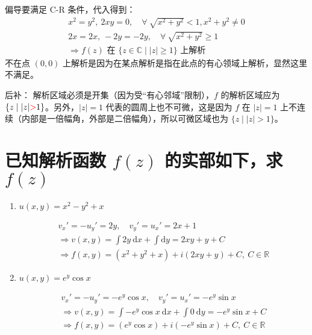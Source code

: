 \documentclass[UTF8]{report}
\def\R{\mathbb{R}}
\def\C{\mathbb{C}}
\theoremstyle{MyLineTheoremStyle} %
\theoremstyle{MyBlockTheoremStyle} %
\theoremstyle{MySubsubsectionStyle} %
\begin{document}
\begin{enumerate}
偏导要满足 C-R 条件，代入得到：
\begin{gather*}
x^2 = y^2,\  2xy = 0, \quad \forall\  \sqrt{x^2+y^2} < 1, x^2 + y^2 \ne 0  \\
2x = 2x,\ -2y = -2y, \quad \forall\ \sqrt{x^2+y^2} \geqslant 1 \\ 
\Longrightarrow \text{$f(z)$ 在 $\{ z\in \C \mid |z| \geqslant 1 \}$ 上解析}
\end{gather*}
不在点 $(0,0)$ 上解析是因为在某点解析是指在此点的有心领域上解析，显然这里不满足。

{\par\color{gray}\small
后补：{\color{red} 解析区域必须是开集}（因为受“有心邻域”限制），$f$ 的解析区域应为 $\{ z\mid | z | {\color{red} >} 1 \}$。另外，$| z | = 1$ 代表的圆周上也不可微，这是因为 $f$ 在 $| z | =1$ 上不连续（内部是一倍幅角，外部是二倍幅角），所以可微区域也为 $\{z \mid | z | >1\}$。
\par}


\end{enumerate}


\section{已知解析函数 $f(z)$ 的实部如下，求 $f(z)$}
\begin{enumerate}
\item $u(x,y) = x^2-y^2 + x$

\begin{gather*}
v_x' = -u_y' = 2y,\quad v_y' = u_x' = 2x + 1\\ 
\Longrightarrow 
v(x,y) = \int 2y \ \mathrm{d}x + \int \mathrm{d}y = 2xy + y + C \\ 
\Longrightarrow f(x,y)= (x^2 + y^2 + x )+ i(2xy + y) + C,\ C \in \R
\end{gather*}
\item $u(x,y) = e^y\cos x$

\begin{gather*}
v_x' = -u_y' = -e^y\cos x,\quad v_y' = u_x' = -e^y\sin x\\ 
\Longrightarrow
v(x,y) = \int -e^y\cos x\  \mathrm{d}x + \int 0\ \mathrm{d}y = - e^y\sin x  + C \\ 
\Longrightarrow f(x,y) = (e^y\cos x) + i(-e^y\sin x ) + C ,\ C \in \R
\end{gather*}
\end{enumerate}
\end{document}
